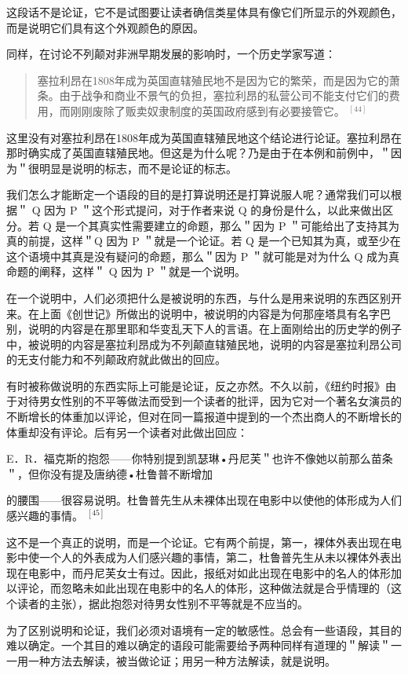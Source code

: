 这段话不是论证，它不是试图要让读者确信类星体具有像它们所显示的外观颜色，而是说明它们具有这个外观颜色的原因。

同样，在讨论不列颠对非洲早期发展的影响时，一个历史学家写道：

\begin{abstract}
塞拉利昂在1808年成为英国直辖殖民地不是因为它的繁荣，而是因为它的萧条。由于战争和商业不景气的负担，塞拉利昂的私营公司不能支付它们的费用，而刚刚废除了贩卖奴隶制度的英国政府感到有必要接管它。 ${ }^{[44]}$
\end{abstract}

这里没有对塞拉利昂在1808年成为英国直辖殖民地这个结论进行论证。塞拉利昂在那时确实成了英国直辖殖民地。但这是为什么呢？乃是由于在本例和前例中，＂因为＂很明显是说明的标志，而不是论证的标志。

我们怎么才能断定一个语段的目的是打算说明还是打算说服人呢？通常我们可以根据＂ Q 因为 P ＂这个形式提问，对于作者来说 Q 的身份是什么，以此来做出区分。若 Q 是一个其真实性需要建立的命题，那么＂因为 P ＂可能给出了支持其为真的前提，这样＂Q 因为 P ＂就是一个论证。若 Q 是一个已知其为真，或至少在这个语境中其真是没有疑问的命题，那么＂因为 P ＂就可能是对为什么 Q 成为真命题的阐释，这样＂ Q 因为 P ＂就是一个说明。

在一个说明中，人们必须把什么是被说明的东西，与什么是用来说明的东西区别开来。在上面《创世记》所做出的说明中，被说明的内容是为何那座塔具有名字巴别，说明的内容是在那里耶和华变乱天下人的言语。在上面刚给出的历史学的例子中，被说明的内容是塞拉利昂成为不列颠直辖殖民地，说明的内容是塞拉利昂公司的无支付能力和不列颠政府就此做出的回应。

有时被称做说明的东西实际上可能是论证，反之亦然。不久以前，《纽约时报》由于对待男女性别的不平等做法而受到一个读者的批评，因为它对一个著名女演员的不断增长的体重加以评论，但对在同一篇报道中提到的一个杰出商人的不断增长的体重却没有评论。后有另一个读者对此做出回应：

E．R．福克斯的抱怨——你特别提到凯瑟琳•丹尼芙＂也许不像她以前那么苗条＂，但你没有提及唐纳德•杜鲁普不断增加

的腰围——很容易说明。杜鲁普先生从未裸体出现在电影中以使他的体形成为人们感兴趣的事情。 ${ }^{[45]}$

这不是一个真正的说明，而是一个论证。它有两个前提，第一，裸体外表出现在电影中使一个人的外表成为人们感兴趣的事情，第二，杜鲁普先生从未以裸体外表出现在电影中，而丹尼芙女士有过。因此，报纸对如此出现在电影中的名人的体形加以评论，而忽略未如此出现在电影中的名人的体形，这种做法就是合乎情理的（这个读者的主张），据此抱怨对待男女性别不平等就是不应当的。

为了区别说明和论证，我们必须对语境有一定的敏感性。总会有一些语段，其目的难以确定。一个其目的难以确定的语段可能需要给予两种同样有道理的＂解读＂一一用一种方法去解读，被当做论证；用另一种方法解读，就是说明。 